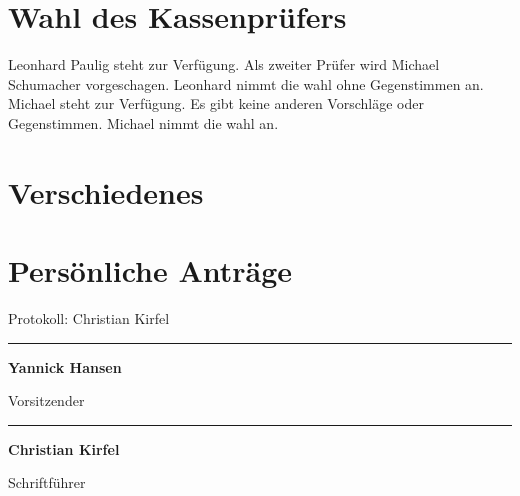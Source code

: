 \documentclass[a4paper, 11pt]{article}
\newcommand\signature[2]{%
\noindent\begin{minipage}{5cm}
    \noindent\vspace{3cm}\par
    \noindent\rule{5cm}{1pt}\par
    \noindent\textbf{#1}\par
    \noindent#2%
\end{minipage}}
\begin{document}
\section*{Wahl des Kassenprüfers}
Leonhard Paulig steht zur Verfügung.
Als zweiter Prüfer wird Michael Schumacher vorgeschagen.
Leonhard nimmt die wahl ohne Gegenstimmen an.
Michael steht zur Verfügung.
Es gibt keine anderen Vorschläge oder Gegenstimmen.
Michael nimmt die wahl an.

\section*{Verschiedenes}

\section*{Persönliche Anträge}

\newpage

Protokoll: Christian Kirfel


\signature{Yannick Hansen}{Vorsitzender}\hfill\signature{Christian Kirfel}{Schriftführer}
\end{document}
